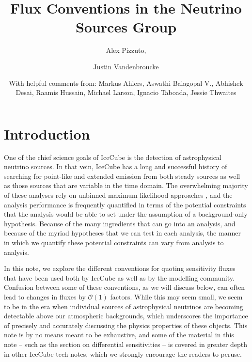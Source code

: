 \documentclass[a4paper,11pt]{article}
\title{\boldmath Flux Conventions in the Neutrino Sources Group}
\author[a]{Alex Pizzuto,}
\author[a]{Justin Vandenbroucke}
\author[]{\normalfont \newline \newline \normalsize With helpful comments from: Markus Ahlers, Aswathi Balagopal V., Abhishek Desai, Raamis Hussain, Michael Larson, Ignacio Taboada, Jessie Thwaites}
\affiliation[a]{Dept. of Physics and Wisconsin IceCube Particle Astrophysics Center, University of Wisconsin, Madison, WI 53706, USA}
\begin{document}
 
\maketitle
\flushbottom

\section{Introduction}

One of the chief science goals of IceCube is the detection of astrophysical neutrino sources. In that vein, IceCube has a long and successful history of searching for point-like and extended emission from both steady sources as well as those sources that are variable in the time domain. The overwhelming majority of these analyses rely on unbinned maximum likelihood approaches \cite{Braun:2008bg}, and the analysis performance is frequently quantified in terms of the potential constraints that the analysis would be able to set under the assumption of a background-only hypothesis. Because of the many ingredients that can go into an analysis, and because of the myriad hypotheses that we can test in each analysis, the manner in which we quantify these potential constraints can vary from analysis to analysis. 

In this note, we explore the different conventions for quoting sensitivity fluxes that have been used both by IceCube as well as by the modelling community. Confusion between some of these conventions, as we will discuss below, can often lead to changes in fluxes by $\mathcal{O}(1)$ factors. While this may seem small, we seem to be in the era when individual sources of astrophysical neutrinos are becoming detectable above our atmospheric backgrounds, which underscores the importance of precisely and accurately discussing the physics properties of these objects. This note is by no means meant to be exhaustive, and some of the material in this note -- such as the section on differential sensitivities -- is covered in greater depth in other IceCube tech notes, which we strongly encourage the readers to peruse. 
\end{document}

